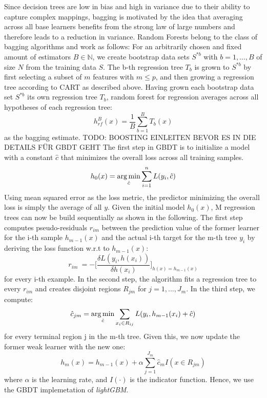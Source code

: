 Since decision trees are low in bias and high in variance due to their ability to capture complex mappings, bagging is motivated by the idea that averaging across all base learners benefits from the strong law of large numbers and therefore leads to a reduction in variance. 
Random Forests belong to the class of bagging algorithms and work as follows:
For an arbitrarily chosen and fixed amount of estimators $ B \in \mathbb{N}$, we create bootstrap data sets $ S^{*b} $ with $ b = 1, \dots, B $ of size $ N $ from the training data $ S $. The b-th regression tree $ T_b $ is grown to $ S^{*b} $ by first selecting a subset of $ m $ features with $ m \leq p $, and then growing a regression tree according to CART as described above.
Having grown each bootstrap data set $ S^{*b} $ its own regression tree $ T_b $, random forest for regression averages across all hypotheses of each regression tree:
\begin{equation}
h^{B}_{rf}(x) = \dfrac{1}{B} \sum_{b=1}^{B} T_b(x)
\end{equation}
as the bagging estimate.
\newline 
\newline
TODO: BOOSTING EINLEITEN BEVOR ES IN DIE DETAILS FÜR GBDT GEHT
\newline
\newline
The first step in GBDT is to initialize a model with a constant $ \hat{c} $ that minimizes the overall loss across all training samples.
\begin{equation}
h_{0}(x) =  \operatorname*{arg\,min}_{\hat{c}} \sum_{i=1}^n L(y_i,\hat{c}) \label{gbdt_step1}
\end{equation}
Using mean squared error as the loss metric, the predictor minimizing the overall loss is simply the average of all $ y $.
Given the initial model $ h_0(x) $, M regression trees can now be build sequentially as shown in the following. 
The first step computes pseudo-residuals $ r_{im} $ between the prediction value of the former learner for the i-th sample $ h_{m-1}(x) $ and the actual i-th target for the m-th tree $ y_i $ by deriving the loss function w.r.t to $ h_{m-1}(x) $: 
\begin{equation}
	r_{im}\ = - \bigg[\dfrac{\delta L(y_i, h(x_i))}{\delta h(x_i)}\bigg]_{h(x) = h_{m-1}(x)}
\end{equation} 
for every i-th example.
In the second step, the algorithm fits a regression tree to every $ r_{im} $ and creates disjoint regions $ R_{jm} $ for $j = 1, ..., J_m$. 
In the third step, we compute: 
\begin{equation}
	\hat{c}_{jm} = \operatorname*{arg\,min}_{\hat{c}} \sum_{x_i \in R_{ij}} L(y_i, h_{m-1}(x_i) + \hat{c})
\end{equation}
for every terminal region j in the m-th tree. 
Given this, we now update the former weak learner with the new one:
\begin{equation}
	h_m(x) = h_{m-1}(x) + \alpha \sum_{j=1}^{J_m} \hat{c}_{m}I(x \in R_{jm})
\end{equation}
where $ \alpha $ is the learning rate, and $ I(\cdot) $ is the indicator function.
Hence, we use the GBDT implemetation of \textit{lightGBM}.


